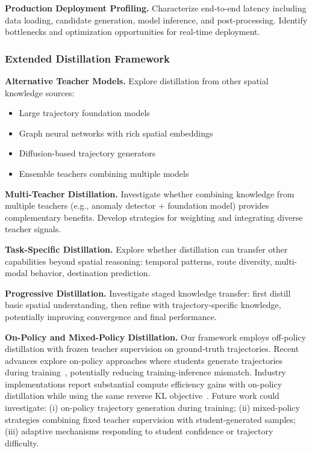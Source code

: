 \textbf{Production Deployment Profiling.} Characterize end-to-end latency including data loading, candidate generation, model inference, and post-processing. Identify bottlenecks and optimization opportunities for real-time deployment.

\subsubsection{Extended Distillation Framework}

\textbf{Alternative Teacher Models.} Explore distillation from other spatial knowledge sources:
\begin{itemize}[noitemsep,topsep=0pt]
    \item Large trajectory foundation models~\cite{maLearningUniversalHuman2025}
    \item Graph neural networks with rich spatial embeddings
    \item Diffusion-based trajectory generators~\cite{chuSimulatingHumanMobility2024}
    \item Ensemble teachers combining multiple models
\end{itemize}

\textbf{Multi-Teacher Distillation.} Investigate whether combining knowledge from multiple teachers (e.g., anomaly detector + foundation model) provides complementary benefits. Develop strategies for weighting and integrating diverse teacher signals.

\textbf{Task-Specific Distillation.} Explore whether distillation can transfer other capabilities beyond spatial reasoning: temporal patterns, route diversity, multi-modal behavior, destination prediction.

\textbf{Progressive Distillation.} Investigate staged knowledge transfer: first distill basic spatial understanding, then refine with trajectory-specific knowledge, potentially improving convergence and final performance.

\textbf{On-Policy and Mixed-Policy Distillation.} Our framework employs off-policy distillation with frozen teacher supervision on ground-truth trajectories. Recent advances explore on-policy approaches where students generate trajectories during training~\cite{singhORPODistillMixedPolicyPreference2025,pengAdaSwitchAdaptiveSwitching2025}, potentially reducing training-inference mismatch. Industry implementations report substantial compute efficiency gains with on-policy distillation while using the same reverse KL objective~\cite{OnPolicyDistillation}. Future work could investigate: (i) on-policy trajectory generation during training; (ii) mixed-policy strategies combining fixed teacher supervision with student-generated samples; (iii) adaptive mechanisms responding to student confidence or trajectory difficulty.

